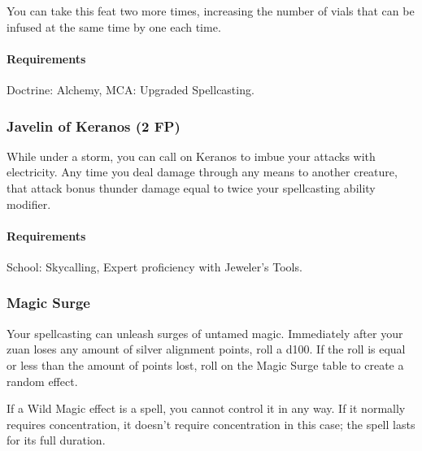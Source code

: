    You can take this feat two more times, increasing the number of vials that can be infused at the same time by one each time.
    \paragraph{Requirements} Doctrine: Alchemy, MCA: Upgraded Spellcasting.
\subsubsection{Javelin of Keranos (2 FP)} \label{feat::javelinofkeranos}
    While under a storm, you can call on Keranos to imbue your attacks with electricity.
    Any time you deal damage through any means to another creature, that attack bonus thunder damage equal to twice your spellcasting ability modifier.
    \paragraph{Requirements} School: Skycalling, Expert proficiency with Jeweler's Tools.
\subsubsection{Magic Surge} \label{feat::magicsurge}
    Your spellcasting can unleash surges of untamed magic.
    Immediately after your zuan loses any amount of silver alignment points, roll a d100.
    If the roll is equal or less than the amount of points lost, roll on the Magic Surge table to create a random effect.

    If a Wild Magic effect is a spell, you cannot control it in any way.
    If it normally requires concentration, it doesn't require concentration in this case; the spell lasts for its full duration.

